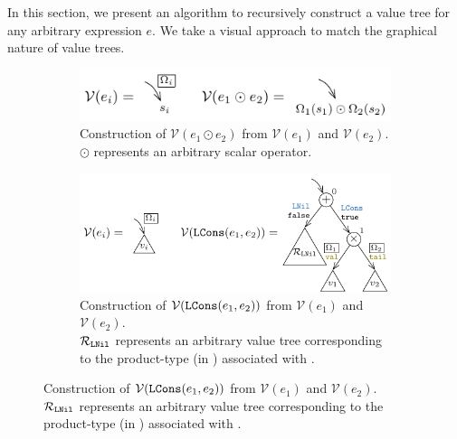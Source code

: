 In this section, we present an algorithm to recursively construct a value tree for any arbitrary expression $e$.
We take a visual approach to match the graphical nature of value trees.

\begin{figure}
\begin{subfigure}[b]{\textwidth}
\begin{center}
\includegraphics[scale=1.3]{chapters/figures/figValueTreeConvScalar.pdf}
\end{center}
\caption{\label{fig:valuetreeconvscalar} Construction of $\mathcal{V}(e_1 \odot e_2)$ from $\mathcal{V}(e_1)$ and $\mathcal{V}(e_2)$.\\
$\odot$ represents an arbitrary scalar operator.}
\end{subfigure}
\begin{subfigure}[b]{\textwidth}
\begin{center}
\includegraphics[scale=1.3]{chapters/figures/figValueTreeConvCons.pdf}
\end{center}
\caption{\label{fig:valuetreeconvcons} Construction of $\mathcal{V}({\tt LCons}(e_1,e_2))$ from $\mathcal{V}(e_1)$ and $\mathcal{V}(e_2)$.\\
$\mathcal{R}_{\tt LNil}$ represents an arbitrary value tree corresponding to the product-type (in \typegrammar{}) associated with .}
\end{subfigure}
\end{figure}

